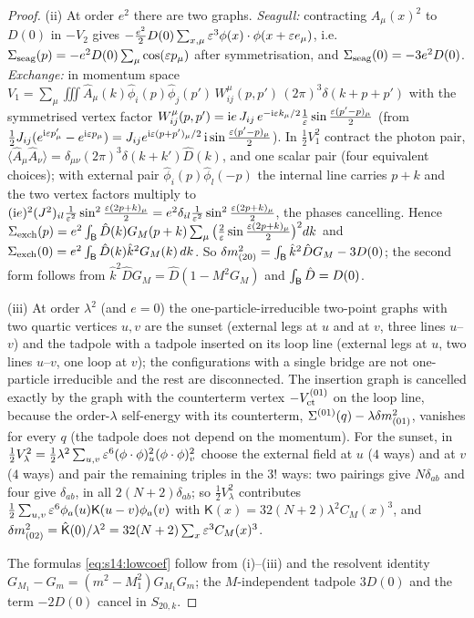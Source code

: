 \begin{proof}
(ii) At order $e^2$ there are two graphs. \emph{Seagull:} contracting $A_\mu(x)^2$ to $D(0)$ in $-V_2$ gives $-\frac{e^2}2D(0)\sum_{x,\mu}\varepsilon^3\phi(x)\cdot\phi(x+\varepsilon e_\mu)$, i.e.\ $\Sigma_{\rm seag}(p)=-e^2D(0)\sum_\mu\cos(\varepsilon p_\mu)$ after symmetrisation, and $\Sigma_{\rm seag}(0)=-3e^2D(0)$. \emph{Exchange:} in momentum space $V_1=\sum_\mu\iiint\hat A_\mu(k)\hat\phi_i(p)\hat\phi_j(p')\,W^\mu_{ij}(p,p')\,(2\pi)^3\delta(k+p+p')$ with the symmetrised vertex factor $W^\mu_{ij}(p,p')=\mathrm ie\,J_{ij}\,e^{-\mathrm i\varepsilon k_\mu/2}\frac1{\varepsilon}\sin\frac{\varepsilon(p'-p)_\mu}2$ (from $\frac12J_{ij}(e^{\mathrm i\varepsilon p'_\mu}-e^{\mathrm i\varepsilon p_\mu})=J_{ij}e^{\mathrm i\varepsilon(p+p')_\mu/2}\,\mathrm i\sin\frac{\varepsilon(p'-p)_\mu}2$). In $\frac12V_1^2$ contract the photon pair, $\langle\hat A_\mu\hat A_\nu\rangle=\delta_{\mu\nu}(2\pi)^3\delta(k+k')\hat D(k)$, and one scalar pair (four equivalent choices); with external pair $\hat\phi_i(p)\hat\phi_l(-p)$ the internal line carries $p+k$ and the two vertex factors multiply to $(\mathrm ie)^2(J^2)_{il}\frac1{\varepsilon^2}\sin^2\frac{\varepsilon(2p+k)_\mu}2=e^2\delta_{il}\frac1{\varepsilon^2}\sin^2\frac{\varepsilon(2p+k)_\mu}2$, the phases cancelling. Hence $\Sigma_{\rm exch}(p)=e^2\int_{\mathsf B}\hat D(k)G_M(p+k)\sum_\mu\big(\frac2{\varepsilon}\sin\frac{\varepsilon(2p+k)_\mu}2\big)^2dk$ and $\Sigma_{\rm exch}(0)=e^2\int_{\mathsf B}\hat D(k)\hat k^2G_M(k)\,dk$. So $\delta m^2_{(20)}=\int_{\mathsf B}\hat k^2\hat DG_M-3D(0)$; the second form follows from $\hat k^2\hat DG_M=\hat D(1-M^2G_M)$ and $\int_{\mathsf B}\hat D=D(0)$.

(iii) At order $\lambda^2$ (and $e=0$) the one-particle-irreducible two-point graphs with two quartic vertices $u,v$ are the sunset (external legs at $u$ and at $v$, three lines $u$--$v$) and the tadpole with a tadpole inserted on its loop line (external legs at $u$, two lines $u$--$v$, one loop at $v$); the configurations with a single bridge are not one-particle irreducible and the rest are disconnected. The insertion graph is cancelled exactly by the graph with the counterterm vertex $-V^{(01)}_{\rm ct}$ on the loop line, because the order-$\lambda$ self-energy with its counterterm, $\Sigma^{(01)}(q)-\lambda\delta m^2_{(01)}$, vanishes for every $q$ (the tadpole does not depend on the momentum). For the sunset, in $\frac12V_\lambda^2=\frac12\lambda^2\sum_{u,v}\varepsilon^6(\phi\cdot\phi)^2_u(\phi\cdot\phi)^2_v$ choose the external field at $u$ ($4$ ways) and at $v$ ($4$ ways) and pair the remaining triples in the $3!$ ways: two pairings give $N\delta_{ab}$ and four give $\delta_{ab}$, in all $2(N+2)\delta_{ab}$; so $\frac12V_\lambda^2$ contributes $\frac12\sum_{u,v}\varepsilon^6\phi_a(u)\mathsf K(u-v)\phi_a(v)$ with $\mathsf K(x)=32(N+2)\lambda^2C_M(x)^3$, and $\delta m^2_{(02)}=\hat{\mathsf K}(0)/\lambda^2=32(N+2)\sum_x\varepsilon^3C_M(x)^3$.

The formulas \eqref{eq:s14:lowcoef} follow from (i)--(iii) and the resolvent identity $G_{M_1}-G_m=(m^2-M_1^2)G_{M_1}G_m$; the $M$-independent tadpole $3D(0)$ and the term $-2D(0)$ cancel in $S_{20,k}$.
\end{proof}


